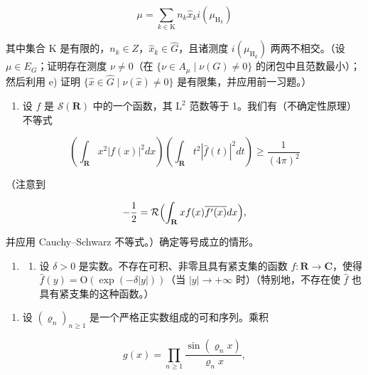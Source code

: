 \[
\mu = \sum_ {k \in \mathrm{K}} n _ {k} \widehat {x} _ {k} i (\mu_ {\mathrm{H} _ {k}})
\]

其中集合 K 是有限的，\(n_{k} \in Z\)，\(\widehat{x}_{k} \in \widehat{G}\)，且诸测度 \(i(\mu_{\mathrm{H}_{k}})\) 两两不相交。（设 \(\mu \in E_{G}\)；证明存在测度 \(\nu \neq 0\)（在 \(\{\nu \in A_{\mu} \mid \nu(G) \neq 0\}\) 的闭包中且范数最小）；然后利用 e) 证明 \(\{\widehat{x} \in \widehat{G} \mid \nu(\widehat{x}) \neq 0\}\) 是有限集，并应用前一习题。）

\begin{enumerate}
\def\labelenumi{\arabic{enumi})}
\setcounter{enumi}{26}
\tightlist
\item
  设 \(f\) 是 \(\mathcal{S}(\mathbf{R})\) 中的一个函数，其 \(\mathrm{L}^2\) 范数等于 1。我们有（不确定性原理）不等式
\end{enumerate}

\[
\left(\int_ {\mathbf {R}} x ^ {2} | f (x) | ^ {2} d x\right) \left(\int_ {\mathbf {R}} t ^ {2} | \widehat {f} (t) | ^ {2} d t\right) \geqslant \frac {1}{(4 \pi) ^ {2}}
\]

（注意到

\[
- \frac {1}{2} = \mathcal {R} \Bigl (\int_ {\mathbf {R}} x f (x) \overline {{f ^ {\prime} (x)}} d x \Bigr),
\]

并应用 Cauchy–Schwarz 不等式。）确定等号成立的情形。

\begin{enumerate}
\def\labelenumi{\arabic{enumi})}
\setcounter{enumi}{27}
\tightlist
\item
  \begin{enumerate}
  \def\labelenumii{\alph{enumii})}
  \tightlist
  \item
  设 \(\delta > 0\) 是实数。不存在可积、非零且具有紧支集的函数 \(f: \mathbf{R} \to \mathbf{C}\)，使得 \(\widehat{f}(y) = \mathrm{O}(\exp(-\delta|y|))\)（当 \(|y| \to +\infty\) 时）（特别地，不存在使 \(\widehat{f}\) 也具有紧支集的这种函数。）
  \end{enumerate}
\end{enumerate}

\begin{enumerate}
\def\labelenumi{\alph{enumi})}
\setcounter{enumi}{1}
\tightlist
\item
  设 \((\varrho_{n})_{n\geqslant1}\) 是一个严格正实数组成的可和序列。乘积
\end{enumerate}

\[
g (x) = \prod_ {n \geqslant 1} \frac {\sin (\varrho_ {n} x)}{\varrho_ {n} x},
\]

